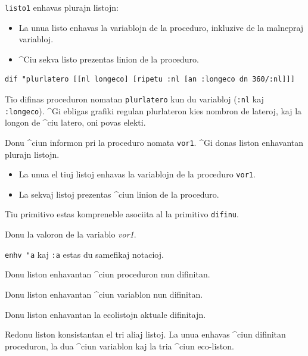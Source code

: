 \texttt{listo1} enhavas plurajn listojn:
\begin{itemize}
\item La unua listo enhavas la variablojn de la proceduro, inkluzive
  de la malnepraj variabloj.
 \item ^Ciu sekva listo prezentas linion de la proceduro.
\end{itemize}

\begin{verbatim}
dif "plurlatero [[nl longeco] [ripetu :nl [an :longeco dn 360/:nl]]]
\end{verbatim}

Tio difinas proceduron nomatan \texttt{plurlatero} kun du variabloj
(\texttt{:nl} kaj \texttt{:longeco}).  ^Gi ebligas grafiki regulan
plurlateron kies nombron de lateroj, kaj la longon de ^ciu latero, oni
povas elekti.


Donu ^ciun informon pri la proceduro nomata \texttt{vor1}.  ^Gi donas
liston enhavantan plurajn listojn.

\begin{itemize}
\item La unua el tiuj listoj enhavas la variablojn de la proceduro
  \texttt{vor1}.
\item La sekvaj listoj prezentas ^ciun linion de la proceduro.
\end{itemize}

Tiu primitivo estas kompreneble asociita al la primitivo
\texttt{difinu}.


Donu la valoron de la variablo \textit{vor1}.

\texttt{enhv "a} kaj \texttt{:a} estas du samefikaj notacioj.


Donu liston enhavantan ^ciun proceduron nun difinitan.


Donu liston enhavantan ^ciun variablon nun difinitan.


Donu liston enhavantan la ecolistojn aktuale difinitajn.


Redonu liston konsistantan el tri aliaj listoj.  La unua enhavas ^ciun
difinitan proceduron, la dua ^ciun variablon kaj la tria ^ciun
eco-liston.

